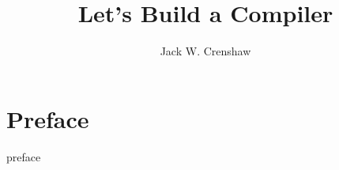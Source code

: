 \documentclass[12pt, letterpaper]{book}
\begin{document}
\title{Let's Build a Compiler}
\author{Jack W. Crenshaw}

\frontmatter
\maketitle
\tableofcontents
\chapter*{Preface}
{preface}
\mainmatter
\end{document}
